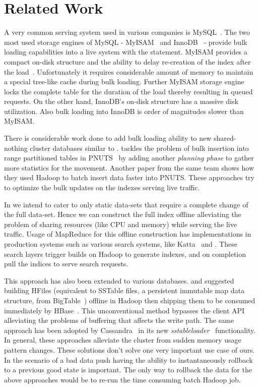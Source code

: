 \section{Related Work}
\label{sec:related_work}
A very common serving system used in various companies is MySQL~\cite{mysql}. The two most used storage engines of MySQL - MyISAM~\cite{myisam} and InnoDB~\cite{innodb} - provide bulk loading capabilities into a live system with the  statement. MyISAM provides a compact on-disk structure and the ability to delay re-creation of the index after the load~\cite{bulk}.  Unfortunately it requires considerable amount of memory to maintain a special tree-like cache during bulk loading. 
Further MyISAM storage engine locks the complete table for the duration of the load thereby resulting in queued requests. On the other hand, InnoDB's on-disk structure has a massive disk utilization. Also bulk loading into InnoDB is order of magnitudes slower than MyISAM. 

There is considerable work done to add bulk loading ability to new shared-nothing cluster\cite{sharednothing} databases similar to \projectname{}. \cite{silberstein} tackles the problem of bulk insertion into range partitioned tables in PNUTS~\cite{pnuts} by adding another \emph {planning phase} to gather more statistics for the movement. Another paper from the same team \cite{pnutsbatch} shows how they used Hadoop to batch insert data faster into PNUTS. These approaches try to optimize the bulk updates on the indexes serving live traffic. 

In \projectname{} we intend to cater to only static data-sets that require a complete change of the full data-set. Hence we can construct the full index offline alleviating the problem of sharing resources (like CPU and memory) while serving the live traffic. Usage of MapReduce for this offline construction has implementations in production systems such as various search systems, like Katta~\cite{katta} and \cite{mika}. These search layers trigger builds on Hadoop to generate indexes, and on completion pull the indices to serve search requests. 

This approach has also been extended to various databases. \cite{konstantinou} and \cite{barbuzzi} suggested building HFiles (equivalent to SSTable files, a persistent immutable map data structure, from BigTable~\cite{bigtable}) offline in Hadoop then shipping them to be consumed immediately by HBase~\cite{hbase}. This unconventional method bypasses the client API alleviating the problems of buffering that affects the write path. The same approach has been adopted by Cassandra~\cite{cassandra} in its new \emph{sstableloader}~\cite{cassandra_bulk} functionality. In general, these approaches alleviate the cluster from sudden memory usage pattern changes. These solutions don't solve one very important use case of ours. In the scenario of a bad data push having the ability to instantaneously rollback to a previous good state is important. The only way to rollback the data for the above approaches would be to re-run the time consuming batch Hadoop job.

